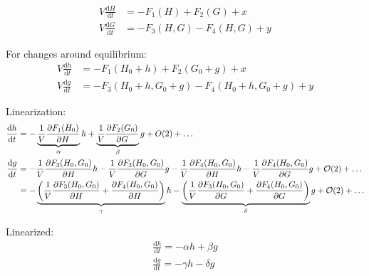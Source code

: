 \documentclass[14pt]{article}
\providecommand{\m}[1]{\ensuremath{\mathrm{#1}}}
\providecommand{\p}[1]{\ensuremath{\partial #1}}
\begin{document}

\begin{align}
V\frac{\m{d} H}{\m{d} t}&=-F_1(H)+F_2(G)+ x\\
V\frac{\m{d} G}{\m{d} t}&=-F_3(H,G)-F_4(H,G) + y 
\end{align}

For changes around equilibrium:
\begin{align}
V\frac{\m{d}h}{\m{d}t}&=-F_1(H_0+h)+F_2(G_0+g)+ x\\
V\frac{\m{d}g}{\m{d}t}&=-F_3(H_0+h,G_0+g)-F_4(H_0+h,G_0+g)+ y
\end{align}

Linearization:
\begin{align}
\frac{\m{d}h}{\m{d}t}&=-\underbrace{%
		\frac{1}{V}\frac{\p F_1(H_0)}{\p H}}_{\alpha}h+%
%
\underbrace{%
		\frac{1}{V}\frac{\p F_2(G_0)}{\p G}}_{\beta}g+O(2)+\dots \\%
%
\frac{\m{d}g}{\m{d}t}&=-\frac{1}{V}\frac{\p F_3(H_0, G_0)}{\p H}h- \frac{1}{V}\frac{\p F_3(H_0, G_0)}{\p G}g-\frac{1}{V}\frac{\p F_4(H_0, G_0)}{\p H}h-\frac{1}{V}\frac{\p F_4(H_0, G_0)}{\p G}g+\mathcal{O}(2)+\dots\\%
%
&=-\underbrace{%
\left(\frac{1}{V}\frac{\p F_3(H_0, G_0)}{\p H}+\frac{\p F_4(H_0, G_0)}{\p H}\right)}_{\gamma}h%
-\underbrace{%
\left(\frac{1}{V}\frac{\p F_3(H_0, G_0)}{\p G}+\frac{\p F_4(H_0, G_0)}{\p G}\right)}_{\delta} g+\mathcal{O}(2)+\dots
\end{align}

Linearized:
\begin{align*}
\frac{\m{d}h}{\m{d}t}=-\alpha h + \beta g\\
\frac{\m{d}g}{\m{d}t}=-\gamma h - \delta g\\
\end{align*}
\end{document}
